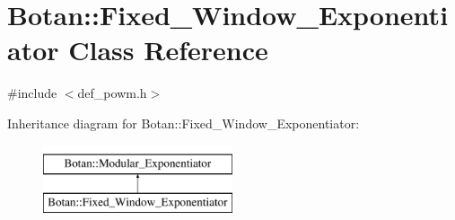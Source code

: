 \hypertarget{classBotan_1_1Fixed__Window__Exponentiator}{\section{Botan\-:\-:Fixed\-\_\-\-Window\-\_\-\-Exponentiator Class Reference}
\label{classBotan_1_1Fixed__Window__Exponentiator}
}


{\ttfamily \#include $<$def\-\_\-powm.\-h$>$}

Inheritance diagram for Botan\-:\-:Fixed\-\_\-\-Window\-\_\-\-Exponentiator\-:\begin{figure}[H]
\begin{center}
\leavevmode
\includegraphics[height=2.000000cm]{classBotan_1_1Fixed__Window__Exponentiator}
\end{center}
\end{figure}
